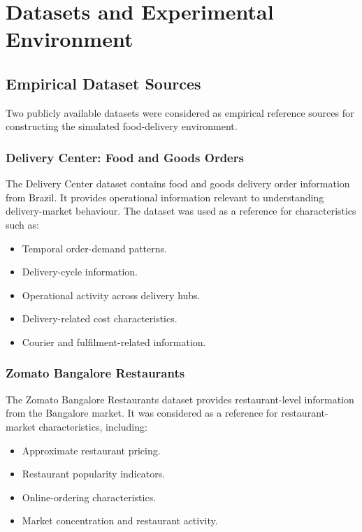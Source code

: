 \documentclass[conference]{IEEEtran}
\begin{document}
\section{Datasets and Experimental Environment}

\subsection{Empirical Dataset Sources}
Two publicly available datasets were considered as empirical reference sources for constructing the simulated food-delivery environment.

\subsubsection{Delivery Center: Food and Goods Orders}
The Delivery Center dataset \cite{deliverycenter} contains food and goods delivery order information from Brazil. It provides operational information relevant to understanding delivery-market behaviour. The dataset was used as a reference for characteristics such as:
\begin{itemize}
  \item Temporal order-demand patterns.
  \item Delivery-cycle information.
  \item Operational activity across delivery hubs.
  \item Delivery-related cost characteristics.
  \item Courier and fulfilment-related information.
\end{itemize}

\subsubsection{Zomato Bangalore Restaurants}
The Zomato Bangalore Restaurants dataset \cite{zomato} provides restaurant-level information from the Bangalore market. It was considered as a reference for restaurant-market characteristics, including:
\begin{itemize}
  \item Approximate restaurant pricing.
  \item Restaurant popularity indicators.
  \item Online-ordering characteristics.
  \item Market concentration and restaurant activity.
\end{itemize}
\end{document}
